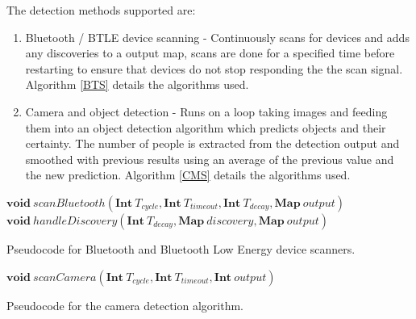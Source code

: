 \documentclass{l4proj}
\begin{document}
The detection methods supported are:
\begin{enumerate}
  \item Bluetooth / BTLE device scanning - Continuously scans for devices and adds any discoveries to a output map, scans are done for a specified time before restarting to ensure that devices do not stop responding the the scan signal. Algorithm \ref{BTS} details the algorithms used.
  \item Camera and object detection - Runs on a loop taking images and feeding them into an object detection algorithm which predicts objects and their certainty. The number of people is extracted from the detection output and smoothed with previous results using an average of the previous value and the new prediction. Algorithm \ref{CMS} details the algorithms used.
\end{enumerate}
\begin{algorithm}
\DontPrintSemicolon
\nl $\textbf{void}~scanBluetooth(\textbf{Int}~T_{cycle}, \textbf{Int}~T_{timeout}, \textbf{Int}~T_{decay}, \textbf{Map}~output)$ \;
\nl {}
\;
\nl $\textbf{void}~handleDiscovery(\textbf{Int}~T_{decay}, \textbf{Map}~discovery, \textbf{Map}~output)$ \;
\nl {}
\;
\caption{Pseudocode for Bluetooth and Bluetooth Low Energy device scanners.}
\label{BTS}
\end{algorithm}

\begin{algorithm}
\DontPrintSemicolon
\nl $\textbf{void}~scanCamera(\textbf{Int}~T_{cycle}, \textbf{Int}~T_{timeout}, \textbf{Int}~output)$ \;
\nl {}
\;
\caption{Pseudocode for the camera detection algorithm.}
\label{CMS}
\end{algorithm}
\end{document}
